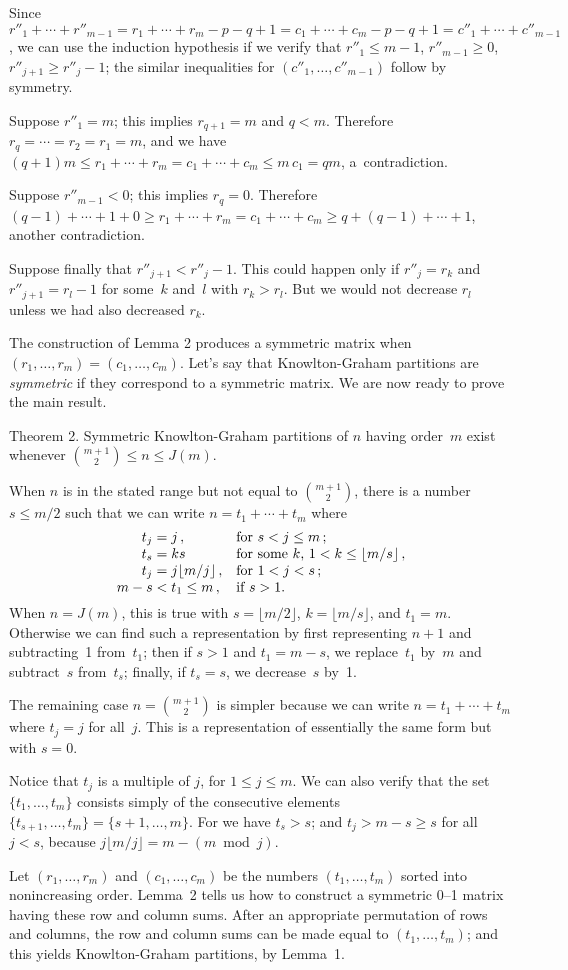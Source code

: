 \documentclass[a4paper,12pt]{article}
\begin{document}
{Since $r''_1+\cdots +r''_{m-1}=r_1+\cdots +r_m-p-q+1=c_1+\cdots +c_m-p-q+1
=c''_1+\cdots+c''_{m-1}$, we can use the induction hypothesis if we verify
that $r''_1\leq m-1$, $r''_{m-1}\geq 0$, $r''_{j+1}\geq r''_j-1$; the similar
inequalities for $(c''_1,\ldots,c''_{m-1})$ follow by symmetry.

Suppose $r''_1=m$; this implies $r_{q+1}=m$ and $q<m$. Therefore
$r_q=\cdots=r_2=r_1=m$, and we have $(q+1)m\leq r_1+\cdots +r_m=c_1+\cdots
+c_m\leq m\,c_1=qm$, a~contradiction.

Suppose $r''_{m-1}<0$; this implies $r_q=0$. Therefore $(q-1)+\cdots +1+0\geq
r_1+\cdots +r_m=c_1+\cdots +c_m\geq q+(q-1)+\cdots +1$, another contradiction.

Suppose finally that $r''_{j+1}<r''_j-1$. This could happen only if
$r''_j=r_k$ and $r''_{j+1}=r_l-1$ for some~$k$ and~$l$ with $r_k>r_l$.
But we would not decrease $r_l$ unless we had also decreased $r_k$. \ \pfbox

\medskip
The  construction of Lemma 2 produces a symmetric matrix when
$(r_1,\ldots,r_m)=(c_1,\ldots,c_m)$. Let's say that Knowlton-Graham partitions
are {\it symmetric\/} if they correspond to a symmetric matrix. We are now
ready to prove the main result.

\proclaim
Theorem 2. Symmetric Knowlton-Graham partitions of $n$ having order~$m$ exist
whenever ${m+1\choose 2}\leq n\leq J(m)$.

\proof
When $n$ is in the stated range but not equal to ${m+1\choose 2}$, there is a
number $s\leq m/2$ such that we can write $n=t_1+\cdots +t_m$ where
$$\vcenter{\halign{\hfil $#\;$&$#$\hfil\quad&#\hfil\cr
t_j&=j\,,&for $s<j\leq m\,;$\cr
t_s&=ks&for some $k$, $1< k\leq \lfloor m/s\rfloor\,,$\cr
t_j&=j\lfloor m/j\rfloor\,,&for $1<j<s\,;$\cr
m-s&<t_1\leq m\,,&if $s>1$.\cr}}$$
When $n=J(m)$, this is true with $s=\lfloor m/2\rfloor$, $k=\lfloor
m/s\rfloor$, and $t_1=m$. Otherwise we can find such a representation by
first
representing $n+1$ and subtracting~1 from~$t_1$; then if $s>1$ and $t_1=m-s$,
we replace~$t_1$ by~$m$ and subtract~$s$ from~$t_s$; finally, if $t_s=s$, we
decrease~$s$ by~1.

The remaining case $n={m+1\choose 2}$ is simpler because we can write
$n=t_1+\cdots+t_m$ where $t_j=j$ for all~$j$. This is a representation of
essentially the same form but with $s=0$.

Notice that $t_j$ is a multiple of $j$, for $1\leq j\leq m$. We can also verify
that the set $\{t_1,\ldots,t_m\}$ consists simply of the consecutive elements
$\{t_{s+1},\ldots,t_m\}=\{s+1,\ldots,m\}$. For we have $t_s>s$; and
$t_j>m-s\geq s$ for all $j<s$, because $j\lfloor m/j\rfloor =m-(m\bmod j)$.

Let $(r_1,\ldots,r_m)$ and $(c_1,\ldots,c_m)$ be the numbers $(t_1,\ldots,t_m)$
sorted into nonincreasing order. Lemma~2 tells us how to construct a symmetric
0--1 matrix having these row and column sums. After an appropriate permutation
of rows and columns, the row and column sums can be made equal to
$(t_1,\ldots,t_m)$; and this yields Knowlton-Graham partitions, by Lemma~1.
\ \pfbox

}
\end{document}
